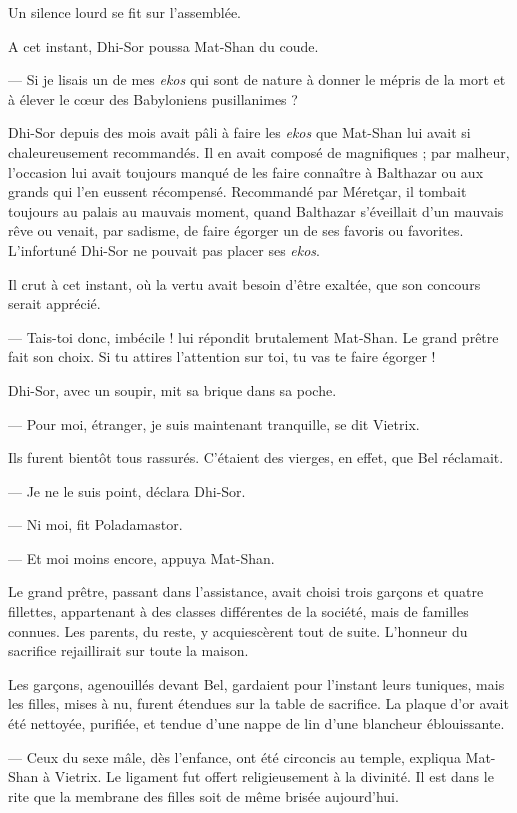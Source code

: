 \documentclass[a4paper, 11pt, oneside, polutonikogreek, french]{article}
\begin{document}
Un silence lourd se fit sur l'assemblée.

A cet instant, Dhi-Sor poussa Mat-Shan du coude.

--- Si je lisais un de mes \emph{ekos} qui sont de nature à donner le mépris de la mort et à élever le cœur des Babyloniens pusillanimes ?

Dhi-Sor depuis des mois avait pâli à faire les \emph{ekos} que Mat-Shan lui avait si chaleureusement recommandés. Il en avait composé de magnifiques ; par malheur, l'occasion lui avait toujours manqué de les faire connaître à Balthazar ou aux grands qui l'en eussent récompensé. Recommandé par Méretçar, il tombait toujours au palais au mauvais moment, quand Balthazar s'éveillait d'un mauvais rêve ou venait, par sadisme, de faire égorger un de ses favoris ou favorites. L'infortuné Dhi-Sor ne pouvait pas placer ses \emph{ekos}.

Il crut à cet instant, où la vertu avait besoin d'être exaltée, que son concours serait apprécié.

--- Tais-toi donc, imbécile ! lui répondit brutalement Mat-Shan. Le grand prêtre fait son choix. Si tu attires l'attention sur toi, tu vas te faire égorger !

Dhi-Sor, avec un soupir, mit sa brique dans sa poche.

--- Pour moi, étranger, je suis maintenant tranquille, se dit Vietrix.

Ils furent bientôt tous rassurés. C'étaient des vierges, en effet, que Bel réclamait.

--- Je ne le suis point, déclara Dhi-Sor.

--- Ni moi, fit Poladamastor.

--- Et moi moins encore, appuya Mat-Shan.

Le grand prêtre, passant dans l'assistance, avait choisi trois garçons et quatre fillettes, appartenant à des classes différentes de la société, mais de familles connues. Les parents, du reste, y acquiescèrent tout de suite. L'honneur du sacrifice rejaillirait sur toute la maison.

\bigskip
\centerline{\EightStarTaper}
\centerline{\EightStarTaper\EightStarTaper}
\bigskip

Les garçons, agenouillés devant Bel, gardaient pour l'instant leurs tuniques, mais les filles, mises à nu, furent étendues sur la table de sacrifice. La plaque d'or avait été nettoyée, purifiée, et tendue d'une nappe de lin d'une blancheur éblouissante.

--- Ceux du sexe mâle, dès l'enfance, ont été circoncis au temple, expliqua Mat-Shan à Vietrix. Le ligament fut offert religieusement à la divinité. Il est dans le rite que la membrane des filles soit de même brisée aujourd'hui.
\end{document}
